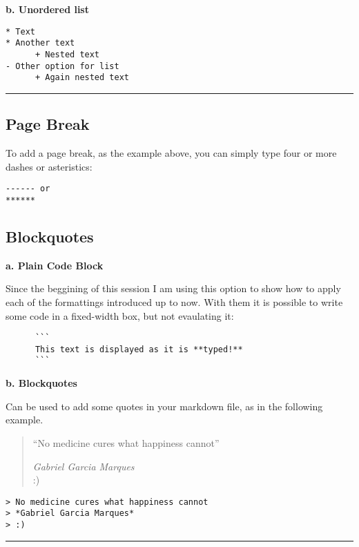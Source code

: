 \documentclass[]{article}
\begin{document}
\textbf{b. Unordered list}

\begin{verbatim}
* Text 
* Another text
      + Nested text
- Other option for list
      + Again nested text
\end{verbatim}

\begin{center}\rule{0.5\linewidth}{\linethickness}\end{center}

\subsection{Page Break}\label{page-break}

To add a page break, as the example above, you can simply type four or
more dashes or asteristics:

\begin{verbatim}
------ or 
******
\end{verbatim}

\subsection{Blockquotes}\label{blockquotes}

\textbf{a. Plain Code Block }

Since the beggining of this session I am using this option to show how
to apply each of the formattings introduced up to now. With them it is
possible to write some code in a fixed-width box, but not evaulating it:

\begin{verbatim}
      ```
      This text is displayed as it is **typed!** 
      ```
\end{verbatim}

\textbf{b. Blockquotes}

Can be used to add some quotes in your markdown file, as in the
following example.

\begin{quote}
``No medicine cures what happiness cannot''

\emph{Gabriel Garcia Marques}\\
:)
\end{quote}

\begin{verbatim}
> No medicine cures what happiness cannot  
> *Gabriel Garcia Marques*  
> :)
\end{verbatim}

\begin{center}\rule{0.5\linewidth}{\linethickness}\end{center}
\end{document}
